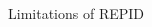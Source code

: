 \documentclass[10pt,compress,t,notes=noshow, xcolor=table]{beamer}
\newcommand{\highlightICE}[1]{\colorbox{cice}{$\displaystyle #1$}}
\newcommand{\highlight}[1]{\colorbox{orange}{$\displaystyle #1$}}
\begin{document}
\begin{frame}{Limitations of REPID}
\begin{columns}[T, totalwidth = \textwidth]
{\begin{column}{0.52\textwidth}
\begin{columns}[T, totalwidth = \linewidth]
\begin{column}{0.025\linewidth}
         \end{column}
     \end{columns}
    \end{column}
}


\end{columns}
\end{frame}
\end{document}
